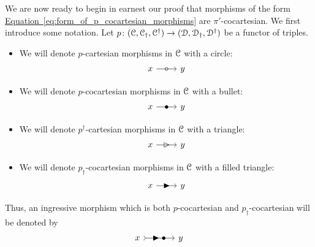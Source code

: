 \documentclass[main.tex]{subfiles}
\begin{document}
We are now ready to begin in earnest our proof that morphisms of the form \hyperref[eq:form_of_p_cocartesian_morphisms]{Equation~\ref*{eq:form_of_p_cocartesian_morphisms}} are $\pi'$-cocartesian. We first introduce some notation. Let $p\colon (\mathcal{C}, \mathcal{C}_{\dagger}, \mathcal{C}^{\dagger}) \to (\mathcal{D}, \mathcal{D}_{\dagger}, \mathcal{D}^{\dagger})$ be a functor of triples.
\begin{itemize}
  \item We will denote $p$-cartesian morphisms in $\mathcal{C}$ with a circle:
    \begin{equation*}
      \begin{tikzcd}
        x
        \arrow[r, "\circ" marking]
        & y
      \end{tikzcd}
    \end{equation*}

  \item We will denote $p$-cocartesian morphisms in $\mathcal{C}$ with a bullet:
    \begin{equation*}
      \begin{tikzcd}
        x
        \arrow[r, "\bullet" marking]
        & y
      \end{tikzcd}
    \end{equation*}

  \item We will denote $p^{\dagger}$-cartesian morphisms in $\mathcal{C}$ with a triangle:
    \begin{equation*}
      \begin{tikzcd}
        x
        \arrow[r, "\vartriangleright" marking]
        & y
      \end{tikzcd}
    \end{equation*}

  \item We will denote $p_{\dagger}$-cocartesian morphisms in $\mathcal{C}$ with a filled triangle:
    \begin{equation*}
      \begin{tikzcd}
        x
        \arrow[r, "\blacktriangleright" marking]
        & y
      \end{tikzcd}
    \end{equation*}
\end{itemize}
Thus, an ingressive morphism which is both $p$-cocartesian and $p_{\dagger}$-cocartesian will be denoted by
\begin{equation*}
  \begin{tikzcd}[column sep=large]
    x
    \arrow[r, rightarrowtail, "\blacktriangleright \bullet" marking]
    & y
  \end{tikzcd}
\end{equation*}
\end{document}
